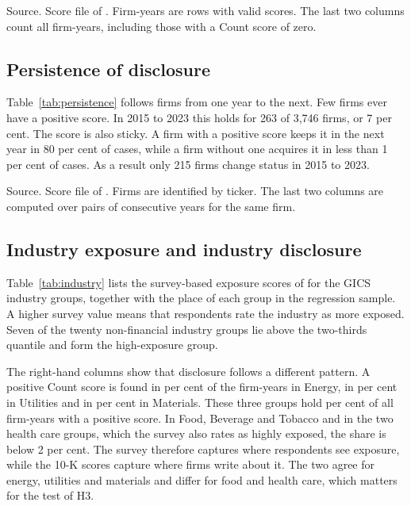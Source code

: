 \documentclass[12pt,a4paper]{article}
\newcommand{\tablenote}[1]{\par\smallskip\begin{minipage}{\linewidth}\footnotesize\setstretch{1.05}#1\end{minipage}}
\newcommand{\widetable}[1]{\resizebox{\ifdim\width>\linewidth\linewidth\else\width\fi}{!}{}}
\begin{document}
\begin{table}[!htbp]
\centering\small
\caption{Biodiversity scores in 10-K filings by period}\label{tab:period}
\widetable{tables/tab_scores_by_period}
\tablenote{Source. Score file of \citet{giglio2026}. Firm-years are rows with valid scores. The last two columns count all firm-years, including those with a Count score of zero.}
\end{table}

\subsection{Persistence of disclosure}

Table~\ref{tab:persistence} follows firms from one year to the next. Few firms ever have a positive score. In 2015 to 2023 this holds for 263 of 3,746 firms, or 7 per cent. The score is also sticky. A firm with a positive score keeps it in the next year in 80 per cent of cases, while a firm without one acquires it in less than 1 per cent of cases. As a result only 215 firms change status in 2015 to 2023.

\begin{table}[!htbp]
\centering\small
\caption{Persistence of the Count score}\label{tab:persistence}
\widetable{tables/tab_persistence}
\tablenote{Source. Score file of \citet{giglio2026}. Firms are identified by ticker. The last two columns are computed over pairs of consecutive years for the same firm.}
\end{table}

\subsection{Industry exposure and industry disclosure}

Table~\ref{tab:industry} lists the survey-based exposure scores of \citet{giglio2026} for the GICS industry groups, together with the place of each group in the regression sample. A higher survey value means that respondents rate the industry as more exposed. Seven of the twenty non-financial industry groups lie above the two-thirds quantile and form the high-exposure group.

The right-hand columns show that disclosure follows a different pattern. A positive Count score is found in \pctEnergy{} per cent of the firm-years in Energy, in \pctUtilities{} per cent in Utilities and in \pctMaterials{} per cent in Materials. These three groups hold \pctTopThree{} per cent of all firm-years with a positive score. In Food, Beverage and Tobacco and in the two health care groups, which the survey also rates as highly exposed, the share is below 2 per cent. The survey therefore captures where respondents see exposure, while the 10-K scores capture where firms write about it. The two agree for energy, utilities and materials and differ for food and health care, which matters for the test of H3.
\end{document}
